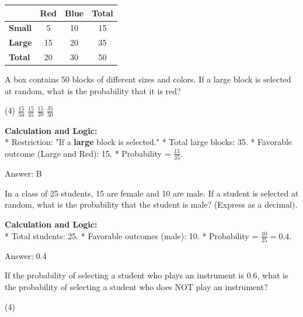 \documentclass[11pt,paper=a4,answers]{exam}
\begin{document}
\begin{questions}
\question
\begin{center}
\begin{tabular}{|l|c|c|c|}
\hline
 & \textbf{Red} & \textbf{Blue} & \textbf{Total} \\ \hline
\textbf{Small} & 5 & 10 & 15 \\ \hline
\textbf{Large} & 15 & 20 & 35 \\ \hline
\textbf{Total} & 20 & 30 & 50 \\ \hline
\end{tabular}
\end{center}
A box contains 50 blocks of different sizes and colors. If a large block is selected at random, what is the probability that it is red?
\begin{tasks}(4)
    \task $\frac{15}{50}$
    \task $\frac{15}{35}$
    \task $\frac{15}{20}$
    \task $\frac{35}{50}$
\end{tasks}

\begin{solution}
\textbf{Calculation and Logic:} \\
* Restriction: "If a \textbf{large} block is selected."
* Total large blocks: 35.
* Favorable outcome (Large and Red): 15.
* Probability = $\frac{15}{35}$.

\vspace{30pt}

Answer: \colorbox{yellow!100}{B}
\end{solution}

\vspace{60pt}

\question
In a class of 25 students, 15 are female and 10 are male. If a student is selected at random, what is the probability that the student is male? (Express as a decimal).

\begin{solution}
\textbf{Calculation and Logic:} \\
* Total students: 25.
* Favorable outcomes (male): 10.
* Probability = $\frac{10}{25} = 0.4$.

\vspace{30pt}

Answer: \colorbox{yellow!100}{0.4}
\end{solution}

\vspace{60pt}

\question
If the probability of selecting a student who plays an instrument is 0.6, what is the probability of selecting a student who does NOT play an instrument?
\begin{tasks}(4)
\end{tasks}


\end{questions}
\end{document}

